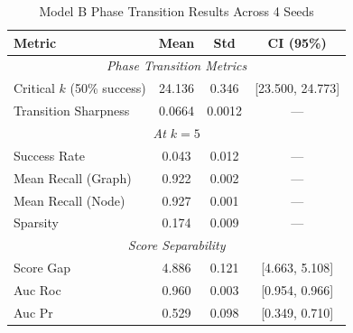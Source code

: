 \begin{table}[htbp]
\centering
\caption{Model B Phase Transition Results Across 4 Seeds}
\label{tab:model_b_results}
\begin{tabular}{lccc}
\hline
\textbf{Metric} & \textbf{Mean} & \textbf{Std} & \textbf{CI (95\%)} \\
\hline
\multicolumn{4}{c}{\textit{Phase Transition Metrics}} \\
Critical $k$ (50\% success) & 24.136 & 0.346 & [23.500, 24.773] \\
Transition Sharpness & 0.0664 & 0.0012 & --- \\
\hline
\multicolumn{4}{c}{\textit{At $k=5$}} \\
Success Rate & 0.043 & 0.012 & --- \\
Mean Recall (Graph) & 0.922 & 0.002 & --- \\
Mean Recall (Node) & 0.927 & 0.001 & --- \\
Sparsity & 0.174 & 0.009 & --- \\
\hline
\multicolumn{4}{c}{\textit{Score Separability}} \\
Score Gap & 4.886 & 0.121 & [4.663, 5.108] \\
Auc Roc & 0.960 & 0.003 & [0.954, 0.966] \\
Auc Pr & 0.529 & 0.098 & [0.349, 0.710] \\
\hline
\end{tabular}
\end{table}
